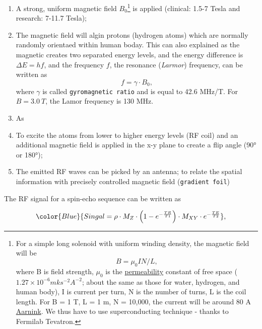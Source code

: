 \documentclass[]{book}
\providecommand{\tightlist}{%
  \setlength{\itemsep}{0pt}\setlength{\parskip}{0pt}}
\let\rmarkdownfootnote\footnote%
\def\footnote{\protect\rmarkdownfootnote}
\theoremstyle{definition}
\theoremstyle{definition}
\theoremstyle{definition}
\theoremstyle{remark}
\begin{document}
\begin{enumerate}
\def\labelenumi{\arabic{enumi}.}
\tightlist
\item
  A strong, uniform magnetic field \(B_0\)\footnote{For a simple long
    solenoid with uniform winding density, the magnetic field will be
    \[ B= \mu_0IN/L,\] where B is field strength, \(\mu_0\) is the
    \href{https://en.wikipedia.org/wiki/Permeability_(electromagnetism)}{permeability}
    constant of free space (\(1.27 \times 10^{-6} mks^{-2}A^{-2}\);
    about the same as those for water, hydrogen, and human body), I is
    current per turn, N is the number of turns, L is the coil length.
    For B = 1 T, L = 1 m, N = 10,000, the current will be around 80 A
    \href{https://www.europhysicsnews.org/articles/epn/pdf/2012/04/epn2012434p26.pdf}{Aarnink}.
    We thus have to use superconducting technique - thanks to Fermilab
    Tevatron.} is applied (clinical: 1.5-7 Tesla and research: 7-11.7
  Tesla);
\item
  The magnetic field will algin protons (hydrogen atoms) which are
  normally randomly orientaed within human boday. This can also
  explained as the magnetic creates two separated energy levels, and the
  energy difference is \(\Delta E = hf\), and the frequency \(f\), the
  resonance (\emph{Larmor}) frequency, can be written as
  \[f=\gamma \cdot B_0,\] where \(\gamma\) is called
  \texttt{gyromagnetic\ ratio} and is equal to 42.6 MHz/T. For
  \(B=3.0\ T\), the Lamor frequency is 130 MHz.
\item
  As
\item
  To excite the atoms from lower to higher energy levels (RF coil) and
  an additional magnetic field is applied in the x-y plane to create a
  flip angle (90° or 180°);
\item
  The emitted RF waves can be picked by an antenna; to relate the
  spatial information with precisely controlled magnetic field
  (\texttt{gradient\ foil})
\end{enumerate}

The RF signal for a spin-echo sequence can be written as

\[
\color{Blue} {Singal=\rho \cdot M_Z \cdot \left( 1-e^{-\frac{TR}{T1}} \right) \cdot M_{XY} \cdot e^{-\frac{TE}{T2}}},
\]
\end{document}

